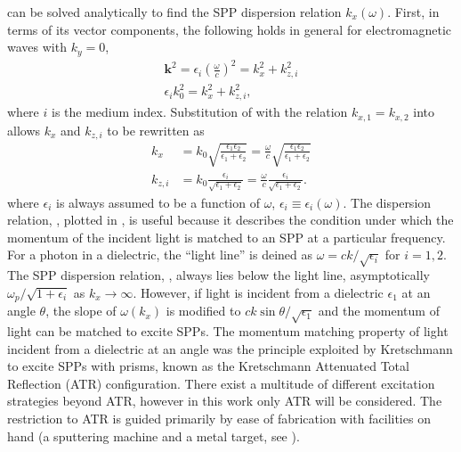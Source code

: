  can be solved analytically to find the SPP
dispersion relation $k_x(\omega)$.
First, in terms of its vector components, the following holds in general
for electromagnetic waves with $k_y=0$,
\begin{align}
\mathbf{k}^2=\epsilon_i \left(\frac{\omega}{c}\right)^2=k_x^2 + k_{z,i}^2\\
\epsilon_i k_0^2=k_x^2 + k_{z,i}^2,
\label{eqn:dispersion1}
\end{align}
where $i$ is the medium index.
Substitution of  with the relation 
$k_{x,1}=k_{x,2}$ into  allows 
$k_x$ and $k_{z,i}$ to be rewritten as
\begin{align}
k_x &= k_0\sqrt{\frac{\epsilon_1 \epsilon_2}{\epsilon_1+\epsilon_2}} 
= \frac{\omega}{c}\sqrt{\frac{\epsilon_1
\epsilon_2}{\epsilon_1+\epsilon_2}} \label{eqn:kayexx}\\
k_{z,i} &= k_0\frac{\epsilon_i}{\sqrt{\epsilon_1+\epsilon_2}}
= \frac{\omega}{c}\frac{\epsilon_i}{\sqrt{\epsilon_1+\epsilon_2}}.
\label{eqn:dandangus}
\end{align}
where $\epsilon_i$ is always assumed to be a function of $\omega$,
$\epsilon_i\equiv\epsilon_i(\omega)$.  The dispersion relation,
, plotted in , is
useful because it describes the condition under which the momentum of the
incident light is matched to an SPP at a particular frequency.  For a
photon in a dielectric, the ``light line'' is deined as $\omega = c k
/\sqrt{\epsilon_i}$ for $i=1,2$.  The SPP dispersion relation,
, always lies below the light line,
asymptotically $\omega_p/\sqrt{1+\epsilon_i}$ as $k_x\to\infty$.
However, if light is incident from a dielectric $\epsilon_1$ at an angle
$\theta$, the slope of $\omega(k_x)$ is modified to $c k \sin
\theta/\sqrt{\epsilon_1}$ and the momentum of light can be matched to
excite SPPs.  The momentum matching property of light incident from a
dielectric at an angle was the principle exploited by Kretschmann
\cite{kretschmann1968} to excite SPPs with prisms, known as the Kretschmann
Attenuated Total Reflection (ATR) configuration.  There exist a multitude of
different excitation strategies beyond ATR, however in this work only ATR
will be considered.  The restriction to ATR is guided primarily by ease of
fabrication with facilities on hand (a sputtering machine and a metal
target, see ).

